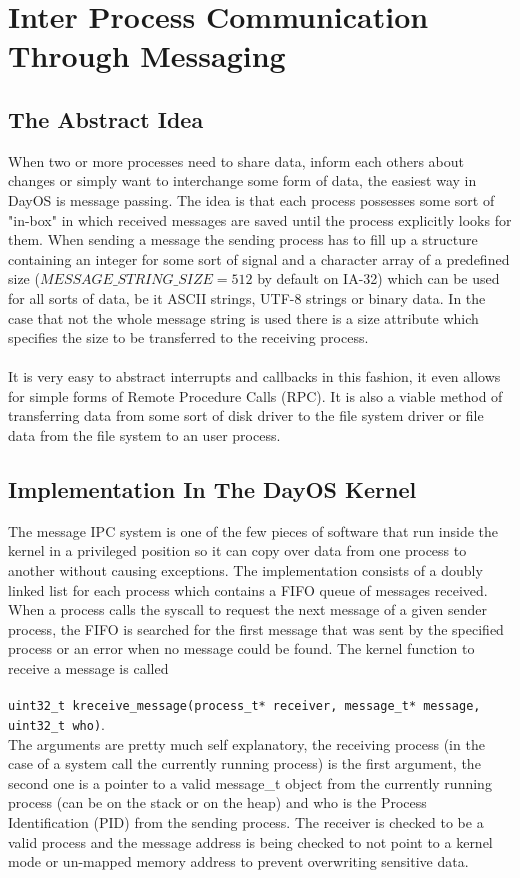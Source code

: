 \chapter{Inter Process Communication Through Messaging}
\section{The Abstract Idea}
When two or more processes need to share data, inform each others about changes or simply want to interchange some form
of data, the easiest way in DayOS is message passing. The idea is that each process possesses some sort of
"in-box" in which received messages are saved until the process explicitly looks for them.
When sending a message the sending process has to fill up a structure containing an integer for some sort of
signal and a character array of a predefined size ($MESSAGE\_STRING\_SIZE = 512$ by default on IA-32) which can be used
for all sorts of data, be it ASCII strings, UTF-8 strings or binary data. In the case that not the whole message
string is used there is a size attribute which specifies the size to be transferred to the receiving process. \\ \\
It is very easy to abstract interrupts and callbacks in this fashion, it even allows for simple forms of Remote Procedure Calls (RPC).
It is also a viable method of transferring data from some sort of disk driver to the file system driver or
file data from the file system to an user process.

\section{Implementation In The DayOS Kernel}
The message IPC system is one of the few pieces of software that run inside the kernel in a privileged position so it can copy over
data from one process to another without causing exceptions. The implementation consists of a doubly linked list for each process which
contains a FIFO queue of messages received. When a process calls the syscall to request the next message of a given sender process,
the FIFO is searched for the first message that was sent by the specified process or an error when no message could be found.
The kernel function to receive a message is called \\ \\
\texttt{uint32\_t kreceive\_message(process\_t* receiver, message\_t* message, uint32\_t who)}. \\
The arguments are pretty much self explanatory, the receiving process (in the case of a system call the currently running process)
is the first argument, the second one is a pointer to a valid message\_t object from the currently running process (can be on the stack or
on the heap) and who is the Process Identification (PID) from the sending process. The receiver is checked to be a valid process and
the message address is being checked to not point to a kernel mode or un-mapped memory address to prevent overwriting sensitive data.
